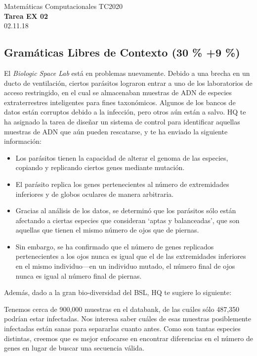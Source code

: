 \documentclass[]{book}
\theoremstyle{definition}
\begin{document}
\begin{center}
{\huge Matemáticas Computacionales TC2020}\\[1.5ex]
{\large \textbf{Tarea EX 02}\\[1.5ex] %
02.11.18} %
\end{center}

\vspace{0.2 cm}

\subsection*{Gramáticas Libres de Contexto (30 \% +9 \%)}

El \textit{Biologic Space Lab} está en problemas nuevamente.
Debido a una brecha en un ducto de ventilación, ciertos parásitos lograron entrar a uno de los laboratorios de acceso restringido, en el cual se almacenaban muestras de ADN de especies extraterrestres inteligentes para fines taxonómicos.
Algunos de los bancos de datos están corruptos debido a la infección, pero otros aún están a salvo.
HQ te ha asignado la tarea de diseñar un sistema de control para identificar aquellas muestras de ADN que aún pueden rescatarse, y te ha enviado la siguiente información:

\begin{itemize}
    \itemsep0em
    \item Los parásitos tienen la capacidad de alterar el genoma de las especies, copiando y replicando ciertos genes mediante mutación.
    \item El parásito replica los genes pertenecientes al número de extremidades inferiores y de globos oculares de manera arbitraria.
    \item Gracias al análisis de los datos, se determinó que los parásitos sólo están afectando a ciertas especies que consideran `aptas y balanceadas', que son aquellas que tienen el mismo número de ojos que de piernas.
    \item Sin embargo, se ha confirmado que el número de genes replicados pertenecientes a los ojos nunca es igual que el de las extremidades inferiores en el mismo individuo---en un individuo mutado, el número final de ojos nunca es igual al número final de piernas.
\end{itemize}

Además, dado a la gran bio-diversidad del BSL, HQ te sugiere lo siguiente:

\begin{tcolorbox}
{\small Tenemos cerca de 900,000 muestras en el databank, de las cuáles sólo 487,350 podrían estar infectadas.
Nos interesa saber cuáles de esas muestras posiblemente infectadas están sanas para separarlas cuanto antes.
Como son tantas especies distintas, creemos que es mejor enfocarse en encontrar diferencias en el número de genes en lugar de buscar una secuencia válida.}
\end{tcolorbox}
\end{document}
